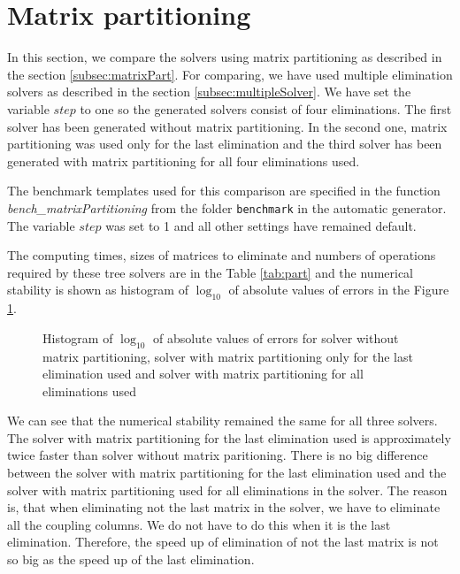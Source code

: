 \section{Matrix partitioning}
\label{exp:part}
In this section, we compare the solvers using matrix partitioning as described in the section \ref{subsec:matrixPart}. For comparing, we have used multiple elimination solvers as described in the section \ref{subsec:multipleSolver}. We have set the variable $step$ to one so the generated solvers consist of four eliminations. The first solver has been generated without matrix partitioning. In the second one, matrix partitioning was used only for the last elimination and the third solver has been generated with matrix partitioning for all four eliminations used.

The benchmark templates used for this comparison are specified in the function \textit{bench\_\-mat\-rix\-Partitioning} from the folder \texttt{benchmark} in the automatic generator. The variable $step$ was set to 1 and all other settings have remained default.

The computing times, sizes of matrices to eliminate and numbers of operations required by these tree solvers are in the Table \ref{tab:part} and the numerical stability is shown as histogram of $\log_{10}$ of absolute values of errors in the Figure \ref{graph:part}.

\begin{figure}[ht]
  \centering
  \resizebox{0.95\textwidth}{!}{}
  \caption{Histogram of $\log_{10}$ of absolute values of errors for solver without matrix partitioning, solver with matrix partitioning only for the last elimination used and solver with matrix partitioning for all eliminations used}
  \label{graph:part}
\end{figure}

We can see that the numerical stability remained the same for all three solvers. The solver with matrix partitioning for the last elimination used is approximately twice faster than solver without matrix paritioning. There is no big difference between the solver with matrix partitioning for the last elimination used and the solver with matrix partitioning used for all eliminations in the solver. The reason is, that when eliminating not the last matrix in the solver, we have to eliminate all the coupling columns. We do not have to do this when it is the last elimination. Therefore, the speed up of elimination of not the last matrix is not so big as the speed up of the last elimination.

